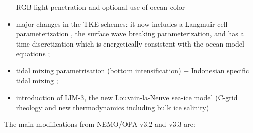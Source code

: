 \documentclass[../main/NEMO_manual]{subfiles}
\begin{document}
\begin{itemize}
  RGB light penetration and optional use of ocean color 
\item
  major changes in the TKE schemes: it now includes a Langmuir cell parameterization \citep{axell_JGR02},
  the \citet{mellor.blumberg_JPO04} surface wave breaking parameterization, and has a time discretization which
  is energetically consistent with the ocean model equations \citep{burchard_OM02, marsaleix.auclair.ea_OM08};
\item
  tidal mixing parametrisation (bottom intensification) + Indonesian specific tidal mixing
  \citep{koch-larrouy.madec.ea_GRL07};
\item
  introduction of LIM-3, the new Louvain-la-Neuve sea-ice model
  (C-grid rheology and new thermodynamics including bulk ice salinity)
  \citep{vancoppenolle.fichefet.ea_OM09*a, vancoppenolle.fichefet.ea_OM09*b}
\end{itemize}

The main modifications from NEMO/OPA v3.2 and v3.3 are:
\end{document}
